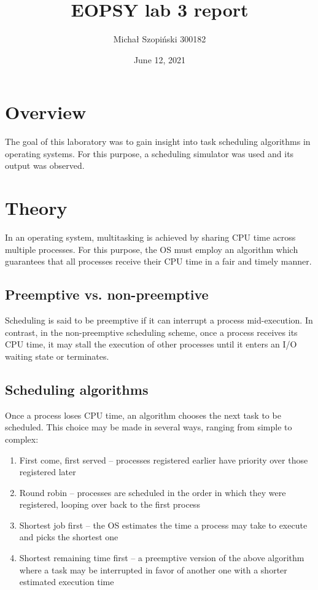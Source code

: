 \documentclass{article}
\begin{document}
    \title{EOPSY lab 3 report}
    \author{Michał Szopiński 300182}
    \date{June 12, 2021}
    \maketitle
    
    \section{Overview}
    
    The goal of this laboratory was to gain insight into task scheduling
    algorithms in operating systems. For this purpose, a scheduling simulator
    was used and its output was observed.
    
    \section{Theory}
    
    In an operating system, multitasking is achieved by sharing CPU time across
    multiple processes. For this purpose, the OS must employ an algorithm which
    guarantees that all processes receive their CPU time in a fair and timely
    manner.
    
    \subsection{Preemptive vs. non-preemptive}
    
    Scheduling is said to be preemptive if it can interrupt a process
    mid-execution. In contrast, in the non-preemptive scheduling scheme, once a
    process receives its CPU time, it may stall the execution of other processes
    until it enters an I/O waiting state or terminates.
    
    \subsection{Scheduling algorithms}
    
    Once a process loses CPU time, an algorithm chooses the next task to be
    scheduled. This choice may be made in several ways, ranging from simple to
    complex:
    
    \begin{enumerate}
        \item First come, first served -- processes registered earlier have
        priority over those registered later
        \item Round robin -- processes are scheduled in the order in which they
        were registered, looping over back to the first process
        \item Shortest job first -- the OS estimates the time a process may
        take to execute and picks the shortest one
        \item Shortest remaining time first -- a preemptive version of the
        above algorithm where a task may be interrupted in favor of another one
        with a shorter estimated execution time
    \end{enumerate}
    
\end{document}
